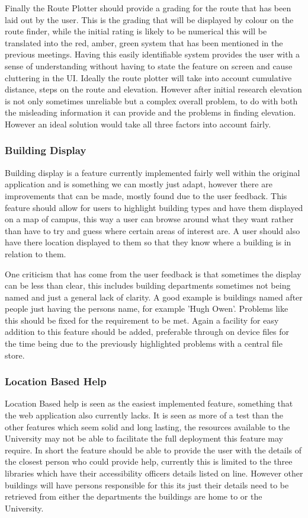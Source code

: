 Finally the Route Plotter should provide a grading for the route that has been laid out by the user. This is the grading that will be displayed by colour on the route finder, while the initial rating is likely to be numerical this will be translated into the red, amber, green system that has been mentioned in the previous meetings. Having this easily identifiable system provides the user with a sense of understanding without having to state the feature on screen and cause cluttering in the UI. Ideally the route plotter will take into account cumulative distance, steps on the route and elevation. However after initial research elevation is not only sometimes unreliable but a complex overall problem, to do with both the misleading information it can provide and the problems in finding elevation. However an ideal solution would take all three factors into account fairly.  
\subsubsection{Building Display}
Building display is a feature currently implemented fairly well within the original application and is something we can mostly just adapt, however there are improvements that can be made, mostly found due to the user feedback. This feature should allow for users to highlight building types and have them displayed on a map of campus, this way a user can browse around what they want rather than have to try and guess where certain areas of interest are. A user should also have there location displayed to them so that they know where a building is in relation to them.

One criticism that has come from the user feedback is that sometimes the display can be less than clear, this includes building departments sometimes not being named and just a general lack of clarity. A good example is buildings named after people just having the persons name, for example 'Hugh Owen'. Problems like this should be fixed for the requirement to be met. Again a facility for easy addition to this feature should be added, preferable through on device files for the time being due to the previously highlighted problems with a central file store. 
\subsubsection{Location Based Help}
Location Based help is seen as the easiest implemented feature, something that the web application also currently lacks. It is seen as more of a test than the other features which seem solid and long lasting, the resources available to the University may not be able to facilitate the full deployment this feature may require.  In short the feature should be able to provide the user with the details of the closest person who could provide help, currently this is limited to the three libraries which have their accessibility officers details listed on line. However other buildings will have persons responsible for this its just their details need to be retrieved from either the departments the buildings are home to or the University.

